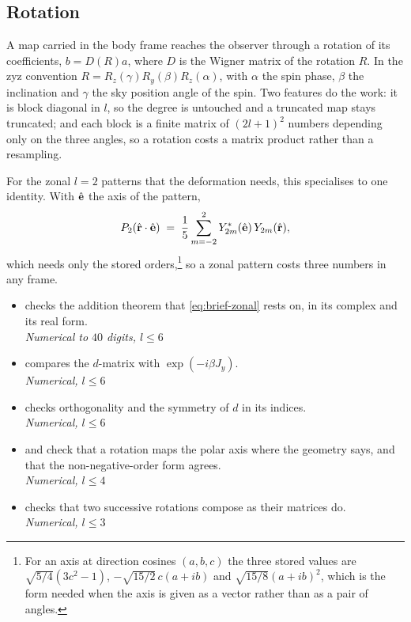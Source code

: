 \subsection{Rotation}

A map carried in the body frame reaches the observer through a rotation of its coefficients,
$b = D(R)a$, where $D$ is the Wigner matrix of the rotation $R$.  In the zyz convention
$R = R_z(\gamma)R_y(\beta)R_z(\alpha)$, with $\alpha$ the spin phase, $\beta$ the inclination
and $\gamma$ the sky position angle of the spin.  Two features do the work: it is block
diagonal in $l$, so the degree is untouched and a truncated map stays truncated; and each block
is a finite matrix of $(2l+1)^2$ numbers depending only on the three angles, so a rotation costs
a matrix product rather than a resampling.

For the zonal $l = 2$ patterns that the deformation needs, this specialises to one identity.
With $\hat{\mathbf e}$ the axis of the pattern,
\begin{equation}
  P_2(\hat{\mathbf r}\cdot\hat{\mathbf e}) \;=\; \frac{1}{5}\sum_{m=-2}^{2}
  Y_{2m}^*(\hat{\mathbf e})\,Y_{2m}(\hat{\mathbf r}) ,
  \label{eq:brief-zonal}
\end{equation}
which needs only the stored orders,\footnote{For an axis at direction cosines $(a,b,c)$ the
three stored values are \mbox{$\sqrt{5/4}(3c^2-1)$}, \mbox{$-\sqrt{15/2}\,c(a+ib)$} and
\mbox{$\sqrt{15/8}(a+ib)^2$}, which is the form needed when the axis is given as a vector
rather than as a pair of angles.}
so a zonal pattern costs three numbers in any frame.


\begin{itemize}
  \item[$\checkmark$]  checks the addition theorem that
    \eqref{eq:brief-zonal} rests on, in its complex and its real form.
    \\[1pt] \quad \emph{Numerical to $40$ digits, $l \le 6$}
  \item[$\checkmark$]  compares the $d$-matrix with
    $\exp(-i\beta J_y)$.
    \\[1pt] \quad \emph{Numerical, $l \le 6$}
  \item[$\checkmark$]  checks orthogonality and the symmetry of
    $d$ in its indices.
    \\[1pt] \quad \emph{Numerical, $l \le 6$}
  \item[$\checkmark$]  and
     check that a rotation maps the polar axis where the
    geometry says, and that the non-negative-order form agrees.
    \\[1pt] \quad \emph{Numerical, $l \le 4$}
  \item[$\checkmark$]  checks that two successive rotations
    compose as their matrices do.
    \\[1pt] \quad \emph{Numerical, $l \le 3$}
\end{itemize}

